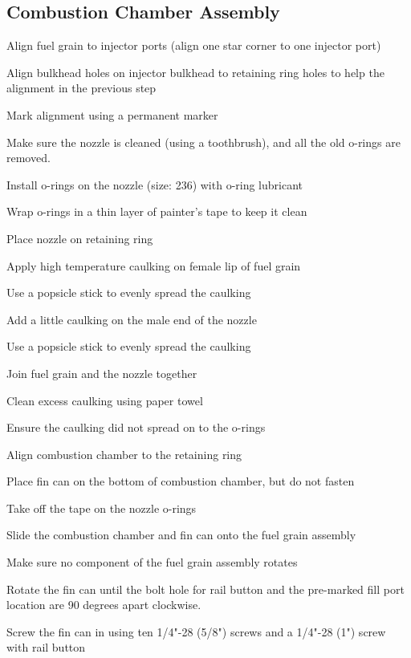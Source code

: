     \subsection{Combustion Chamber Assembly}
    \begin{checklist} %
        \item Align fuel grain to injector ports (align one star corner to one injector port)
        \item Align bulkhead holes on injector bulkhead to retaining ring holes to help the alignment in the previous step
        \item Mark alignment using a permanent marker
        \item Make sure the nozzle is cleaned (using a toothbrush), and all the old o-rings are removed.
        \item Install o-rings on the nozzle (size: 236) with o-ring lubricant
        \item Wrap o-rings in a thin layer of painter’s tape to keep it clean
        \item Place nozzle on retaining ring
        \item Apply high temperature caulking on female lip of fuel grain
        \item Use a popsicle stick to evenly spread the caulking
        \item Add a little caulking on the male end of the nozzle
        \item Use a popsicle stick to evenly spread the caulking
        \item Join fuel grain and the nozzle together
        \item Clean excess caulking using paper towel
        \item Ensure the caulking did not spread on to the o-rings
        \item Align combustion chamber to the retaining ring
        \item Place fin can on the bottom of combustion chamber, but do not fasten
        \item Take off the tape on the nozzle o-rings
        \item Slide the combustion chamber and fin can onto the fuel grain assembly
        \item Make sure no component of the fuel grain assembly rotates
        \item Rotate the fin can until the bolt hole for rail button and the pre-marked fill port location are 90 degrees apart clockwise.
        \item Screw the fin can in using ten 1/4"-28 (5/8") screws and a 1/4"-28 (1") screw with rail button

\end{checklist}
